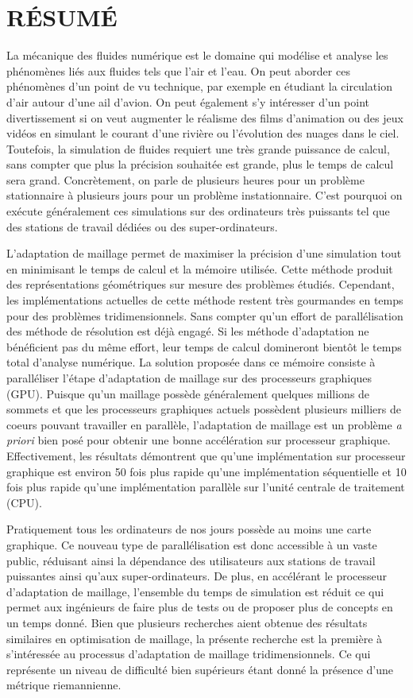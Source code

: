 \section*{\hfil RÉSUMÉ\hfil}

La mécanique des fluides numérique est le domaine qui modélise et analyse les phénomènes liés aux fluides tels que l'air et l'eau. On peut aborder ces phénomènes d'un point de vu technique, par exemple en étudiant la circulation d'air autour d'une ail d'avion. On peut également s'y intéresser d'un point divertissement si on veut augmenter le réalisme des films d'animation ou des jeux vidéos en simulant le courant d'une rivière ou l'évolution des nuages dans le ciel. Toutefois, la simulation de fluides requiert une très grande puissance de calcul, sans compter que plus la précision souhaitée est grande, plus le temps de calcul sera grand. Concrètement, on parle de plusieurs heures pour un problème stationnaire à plusieurs jours pour un problème instationnaire. C'est pourquoi on exécute généralement ces simulations sur des ordinateurs très puissants tel que des stations de travail dédiées ou des super-ordinateurs.

L'adaptation de maillage permet de maximiser la précision d'une simulation tout en minimisant le temps de calcul et la mémoire utilisée. Cette méthode produit des représentations géométriques sur mesure des problèmes étudiés. Cependant, les implémentations actuelles de cette méthode restent très gourmandes en temps pour des problèmes tridimensionnels. Sans compter qu'un effort de parallélisation des méthode de résolution est déjà engagé. Si les méthode d'adaptation ne bénéficient pas du même effort, leur temps de calcul domineront bientôt le temps total d'analyse numérique. La solution proposée dans ce mémoire consiste à paralléliser l'étape d'adaptation de maillage sur des processeurs graphiques (GPU). Puisque qu'un maillage possède généralement quelques millions de sommets et que les processeurs graphiques actuels possèdent plusieurs milliers de coeurs pouvant travailler en parallèle, l'adaptation de maillage est un problème \textit{a priori} bien posé pour obtenir une bonne accélération sur processeur graphique. Effectivement, les résultats démontrent que qu'une implémentation sur processeur graphique est environ 50 fois plus rapide qu'une implémentation séquentielle et 10 fois plus rapide qu'une implémentation parallèle sur l'unité centrale de traitement (CPU).

Pratiquement tous les ordinateurs de nos jours possède au moins une carte graphique. Ce nouveau type de parallélisation est donc accessible à un vaste public, réduisant ainsi la dépendance des utilisateurs aux stations de travail puissantes ainsi qu'aux super-ordinateurs. De plus, en accélérant le processeur d'adaptation de maillage, l'ensemble du temps de simulation est réduit ce qui permet aux ingénieurs de faire plus de tests ou de proposer plus de concepts en un temps donné. Bien que plusieurs recherches aient obtenue des résultats similaires en optimisation de maillage, la présente recherche est la première à s'intéressée au processus d'adaptation de maillage tridimensionnels. Ce qui représente un niveau de difficulté bien supérieurs étant donné la présence d'une métrique riemannienne.

